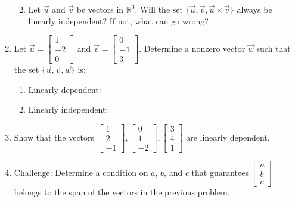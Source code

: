 \documentclass[12pt]{article}
\newcommand{\R}{\mathbb{R}}
\newcommand{\bbm}{\begin{bmatrix}}
\newcommand{\ebm}{\end{bmatrix}}
\begin{document}
\begin{enumerate}
\begin{enumerate}
\vspace{1in}

\item Let $\vec{u}$ and $\vec{v}$ be vectors in $\R^3$. Will the set $\{\vec{u},\vec{v}, \vec{u}\times\vec{v}\}$ always be linearly independent? If not, what can go wrong?

\vspace{1in}
\end{enumerate}

\item Let $\vec{u} = \bbm 1\\-2\\0\ebm$ and $\vec{v} = \bbm 0\\-1\\3\ebm$. Determine a nonzero vector $\vec{w}$ such that the set $\{\vec{u},\vec{v},\vec{w}\}$ is:
\begin{enumerate}
\item Linearly dependent:

\vspace{0.75in}

\item Linearly independent:
\end{enumerate}
\newpage

\item Show that the vectors $\bbm 1\\2\\-1\ebm, \bbm 0\\1\\-2\ebm, \bbm 3\\4\\1\ebm$ are linearly dependent.

\vspace{4in}

\item Challenge: Determine a condition on  $a$, $b$, and $c$ that guarantees $\bbm a\\b\\c\ebm$ belongs to the span of the vectors in the previous problem.

 \end{enumerate}
 
\end{document}

